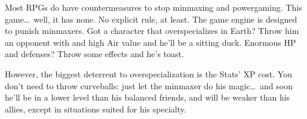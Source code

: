 \begin{multicols}{2}
\begin{mog}
    Most RPGs do have countermeasures to stop minmaxing and powergaming. This game\ldots{}\ well, it has none. No explicit rule, at least. The game engine is designed to punish minmaxers. Got a character that overspecializes in Earth? Throw him an opponent with  and high Air value and he'll be a sitting duck. Enormous HP and defenses? Throw some  effects and he's toast. \pc%

    However, the biggest deterrent to overspecialization is the Stats' XP cost. You don't need to throw curveballs: just let the minmaxer do his magic\ldots{}\ and soon he'll be in a lower level than his balanced friends, and will be weaker than his allies, except in situations suited for his specialty.
\end{mog}
\end{multicols}


